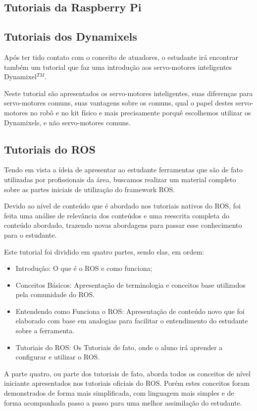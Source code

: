 \subsection{Tutoriais da Raspberry Pi}

\subsection{Tutoriais dos Dynamixels}
Após ter tido contato com o conceito de atuadores, o estudante irá encontrar também um tutorial que faz uma introdução aos servo-motores inteligentes Dynamixel$^{TM}$.

Neste tutorial são apresentados os servo-motores inteligentes, suas diferenças para servo-motores comuns, suas vantagens sobre os comuns, qual o papel destes servo-motores no robô e no kit físico e mais precisamente porquê escolhemos utilizar os Dynamixels, e não servo-motores comuns. \cite{tutDyna}


\subsection{Tutoriais do ROS}
Tendo em vista a ídeia de apresentar ao estudante ferramentas que são de fato utilizadas por profissionais da área, buscamos realizar um material completo sobre as partes iniciais de utilização do framework ROS.

Devido ao nível de conteúdo que é abordado nos tutoriais nativos do ROS, foi feita uma análise de relevância dos conteúdos e uma reescrita completa do conteúdo abordado, trazendo novas abordagens para passar esse conhecimento para o estudante.

Este tutorial foi dividido em quatro partes, sendo elas, em ordem:
\begin{itemize}
	\item Introdução: O que é o ROS e como funciona;
	\item Conceitos Básicos: Apresentação de terminologia e conceitos base utilizados pela comunidade do ROS.
	\item Entendendo como Funciona o ROS: Apresentação de conteúdo novo que foi elaborado com base em analogias para facilitar o entendimento do estudante sobre a ferramenta.
	\item Tutoriais do ROS: Os Tutoriais de fato, onde o aluno irá aprender a configurar e utilizar o ROS.
\end{itemize}

A parte quatro, ou parte dos tutoriais de fato, aborda todos os conceitos de nível iniciante apresentados nos tutoriais oficiais do ROS. Porém estes conceitos foram demonstrados de forma mais simplificada, com linguagem mais simples e de forma acompanhada passo a passo para uma melhor assimilação do estudante.

